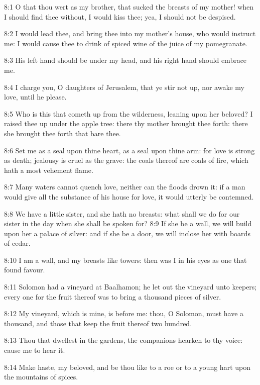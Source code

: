 8:1 O that thou wert as my brother, that sucked the breasts of my mother!  when I should find thee without, I would kiss thee; yea, I should not be despised.

8:2 I would lead thee, and bring thee into my mother's house, who would instruct me: I would cause thee to drink of spiced wine of the juice of my pomegranate.

8:3 His left hand should be under my head, and his right hand should embrace me.

8:4 I charge you, O daughters of Jerusalem, that ye stir not up, nor awake my love, until he please.

8:5 Who is this that cometh up from the wilderness, leaning upon her beloved? I raised thee up under the apple tree: there thy mother brought thee forth: there she brought thee forth that bare thee.

8:6 Set me as a seal upon thine heart, as a seal upon thine arm: for love is strong as death; jealousy is cruel as the grave: the coals thereof are coals of fire, which hath a most vehement flame.

8:7 Many waters cannot quench love, neither can the floods drown it: if a man would give all the substance of his house for love, it would utterly be contemned.

8:8 We have a little sister, and she hath no breasts: what shall we do for our sister in the day when she shall be spoken for?  8:9 If she be a wall, we will build upon her a palace of silver: and if she be a door, we will inclose her with boards of cedar.

8:10 I am a wall, and my breasts like towers: then was I in his eyes as one that found favour.

8:11 Solomon had a vineyard at Baalhamon; he let out the vineyard unto keepers; every one for the fruit thereof was to bring a thousand pieces of silver.

8:12 My vineyard, which is mine, is before me: thou, O Solomon, must have a thousand, and those that keep the fruit thereof two hundred.

8:13 Thou that dwellest in the gardens, the companions hearken to thy voice: cause me to hear it.

8:14 Make haste, my beloved, and be thou like to a roe or to a young hart upon the mountains of spices.

